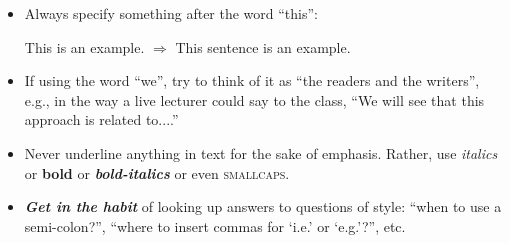 \documentclass[11pt]{article}
\begin{document}
\begin{itemize}
\item Always specify something after the word ``this'':
\begin{center}
This is an example. $\Rightarrow$ This sentence is an example.
\end{center}

\item If using the word ``we'', try to think of it as ``the readers and the writers'', e.g., in the way a live lecturer could say to the class, ``We will see that this approach is related to....''

\item Never underline anything in text for the sake of emphasis. Rather, use \textit{italics} or \textbf{bold} or \textbf{\textit{bold-italics}} or even \textsc{smallcaps}.

\item \textbf{\textit{Get in the habit}} of looking up answers to questions of style: ``when to use a semi-colon?'', ``where to insert commas for `i.e.' or `e.g.'?'', etc.

\end{itemize}
\end{document}
